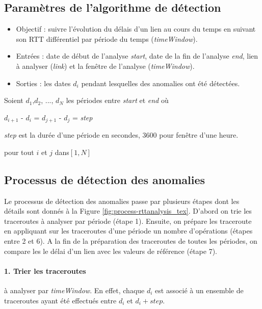 \begin{figure}[H]
	\centering
	\resizebox{\textwidth}{!}{
	
}
	\caption{}
	\label{fig:traceroute}
\end{figure}

\subsection{Paramètres de l'algorithme de  détection}

\begin{itemize}
		\item  Objectif : suivre l'évolution du délais d'un lien au cours du temps en suivant son RTT différentiel par période du temps (\textit{timeWindow}).
	\item Entrées : date de début de l'analyse \textit{start}, date de la fin de l'analyse \textit{end}, lien à analyser (\textit{link}) et la fenêtre de l'analyse (\textit{timeWindow}).
	\item Sorties : les dates $d_i$ pendant lesquelles des anomalies ont été détectées.
\end{itemize}

Soient $ d_1 $,$  d_2 $, ..., $ d_N $ les périodes entre \textit{start} et \textit{end} où

\begin{center}
	 $  d_{i+1} $ - $  d_{i} $ = $  d_{j+1} $ - $  d_{j} $ = \textit{step} 
	 
	 \textit{step} est la durée d'une période en secondes, $3600$ pour fenêtre d'une heure.
\end{center}
 
 pour tout $ i $ et $ j $ dans$  [1,N] $
\subsection{Processus de  détection des anomalies }\label{steps-rtt-analysis}

Le processus de  détection des anomalies passe par plusieurs étapes dont les détails sont donnés à la Figure \ref{fig:process-rttanalysis_tex}. D'abord on  trie les traceroutes à analyser par période (étape 1). Ensuite, on prépare les traceroute en    appliquant sur les traceroutes d'une période un nombre d'opérations (étapes entre 2 et 6). A la fin de la préparation des traceroutes de toutes les périodes, on compare les le délai d'un lien avec les valeurs de référence (étape 7).
\paragraph{1. Trier les traceroutes } à analyser par \textit{timeWindow}. En effet, chaque $d_i$ est associé à un ensemble de traceroutes ayant été effectués entre $d_i$ et $d_i + step$. 




